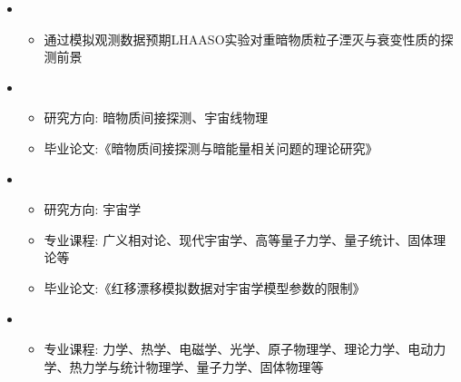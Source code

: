   \begin{itemize}[leftmargin=*]
     \item
      {\small
      \begin{itemize}
         \item 通过模拟观测数据预期LHAASO实验对重暗物质粒子湮灭与衰变性质的探测前景     
      \end{itemize}
      }
    \item
      {\small
      \begin{itemize}
         \item 研究方向:  暗物质间接探测、宇宙线物理
         \item 毕业论文:《暗物质间接探测与暗能量相关问题的理论研究》
      \end{itemize}
      }
      
     \item    
      {\small
      \begin{itemize}
         \item{研究方向:  宇宙学}
         \item 专业课程: 广义相对论、现代宇宙学、高等量子力学、量子统计、固体理论等       
         \item 毕业论文:《红移漂移模拟数据对宇宙学模型参数的限制》
      \end{itemize}
      }

    \item
      {\small
      \begin{itemize}
         \item 专业课程: 力学、热学、电磁学、光学、原子物理学、理论力学、电动力学、热力学与统计物理学、量子力学、固体物理等
      \end{itemize}
      }
  \end{itemize}